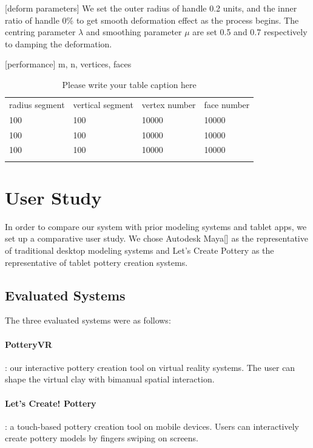 [deform parameters]
We set the outer radius of handle 0.2 units, and the inner ratio of handle 0\% to get smooth deformation effect as the process begins. The centring parameter $\lambda$ and smoothing parameter $\mu$ are set 0.5 and 0.7 respectively to damping the deformation.

[performance]
m, n, vertices, faces

\begin{table}
\caption{Please write your table caption here}
\label{tab:1}       %
\begin{tabular}{llll}
\hline\noalign{\smallskip}
radius segment & vertical segment & vertex number & face number \\
\noalign{\smallskip}\hline\noalign{\smallskip}
100 & 100 & 10000 & 10000 \\
100 & 100 & 10000 & 10000 \\
100 & 100 & 10000 & 10000 \\
\noalign{\smallskip}\hline
\end{tabular}
\end{table}

\section{User Study}
\label{sec:6}
In order to compare our system with prior modeling systems and tablet apps, we set up a comparative user study. We chose Autodesk Maya[] as the representative of traditional desktop modeling systems and Let's Create Pottery as the representative of tablet pottery creation systems.

\subsection{Evaluated Systems}
\label{sec:6.1}
The three evaluated systems were as follows:

\paragraph{PotteryVR}: our interactive pottery creation tool on virtual reality systems. The user can shape the virtual clay with bimanual spatial interaction.
\paragraph{Let’s Create! Pottery}: a touch-based pottery creation tool on mobile devices. Users can interactively create pottery models by fingers swiping on screens.\cite{website:letspottery}
